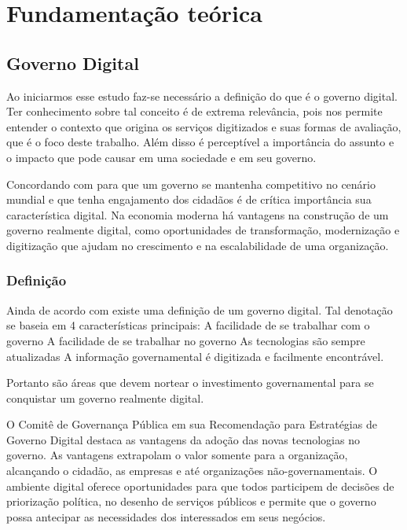 \chapter[Fundamentação teórica]{Fundamentação teórica}

\section{Governo Digital}
Ao iniciarmos esse estudo faz-se necessário a definição do que é o governo digital. Ter conhecimento sobre tal conceito é de extrema relevância, pois nos permite entender o contexto que origina os serviços digitizados e suas formas de avaliação, que é o foco deste trabalho. Além disso é perceptível a importância do assunto e o impacto que pode causar em uma sociedade e em seu governo.

Concordando com \cite{itac2016} para que um governo se mantenha competitivo no cenário mundial e que tenha engajamento dos cidadãos é de crítica importância sua característica digital. Na economia moderna há vantagens na construção de um governo realmente digital, como oportunidades de transformação, modernização e digitização que ajudam no crescimento e na escalabilidade de uma organização.

\subsection{Definição}

Ainda de acordo com \cite{itac2016} existe uma definição de um governo digital. Tal denotação se baseia em 4 características principais:
A facilidade de se trabalhar com o governo
A facilidade de se trabalhar no governo
As tecnologias são sempre atualizadas 
A informação governamental é digitizada e facilmente encontrável.

Portanto são áreas que devem nortear o investimento governamental para se conquistar um governo realmente digital.
 
O Comitê de Governança Pública em sua Recomendação para Estratégias de Governo Digital \cite{oecd2014} destaca as vantagens da adoção das novas tecnologias no governo. As vantagens extrapolam o valor somente para a organização, alcançando o cidadão, as empresas e até organizações não-governamentais. O ambiente digital oferece oportunidades para que todos participem de decisões de priorização política, no desenho de serviços públicos e permite que o governo possa antecipar as necessidades dos interessados em seus negócios.

